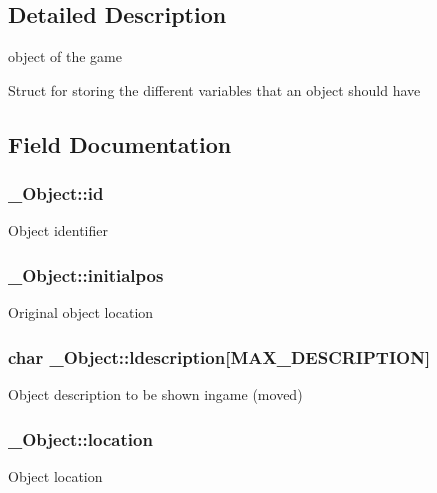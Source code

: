 \subsection{Detailed Description}
object of the game 

Struct for storing the different variables that an object should have 

\subsection{Field Documentation}
\subsubsection[{\texorpdfstring{id}{id}}]{ \+\_\+\+Object\+::id}\hypertarget{struct__Object_a3cff7a0e8dc4e9d23895ed9af1b7653a}{}\label{struct__Object_a3cff7a0e8dc4e9d23895ed9af1b7653a}
Object identifier 
\subsubsection[{\texorpdfstring{initialpos}{initialpos}}]{ \+\_\+\+Object\+::initialpos}\hypertarget{struct__Object_a14c4dfa849520565b86f235c87827546}{}\label{struct__Object_a14c4dfa849520565b86f235c87827546}
Original object location 
\subsubsection[{\texorpdfstring{ldescription}{ldescription}}]{\setlength{\rightskip}{0pt plus 5cm}char \+\_\+\+Object\+::ldescription\mbox{[}{\bf M\+A\+X\+\_\+\+D\+E\+S\+C\+R\+I\+P\+T\+I\+ON}\mbox{]}}\hypertarget{struct__Object_ace9493f4f8d73f26e2cc79bb65bf6309}{}\label{struct__Object_ace9493f4f8d73f26e2cc79bb65bf6309}
Object description to be shown ingame (moved) 
\subsubsection[{\texorpdfstring{location}{location}}]{ \+\_\+\+Object\+::location}\hypertarget{struct__Object_a3c596b8898734de2f71fd1a33dfa72fb}{}\label{struct__Object_a3c596b8898734de2f71fd1a33dfa72fb}
Object location 
